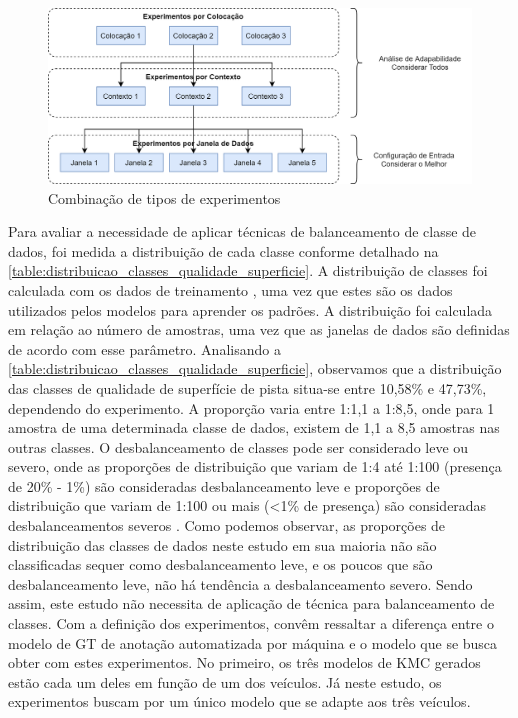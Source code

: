 \begin{figure}[h]
  \centering
  \caption{Combinação de tipos de experimentos}
  \label{fig:combinacao_experimentos_3}
  \includegraphics[width=1\textwidth]{figuras/fig_45_1.png}
\end{figure}

Para avaliar a necessidade de aplicar técnicas de balanceamento de classe de dados, foi medida a distribuição de cada classe conforme detalhado na \autoref{table:distribuicao_classes_qualidade_superficie}. A distribuição de classes foi calculada com os dados de treinamento \cite{He2013,Kuhn2013}, uma vez que estes são os dados utilizados pelos modelos para aprender os padrões. A distribuição foi calculada em relação ao número de amostras, uma vez que as janelas de dados são definidas de acordo com esse parâmetro. Analisando a \autoref{table:distribuicao_classes_qualidade_superficie}, observamos que a distribuição das classes de qualidade de superfície de pista situa-se entre 10,58\% e 47,73\%, dependendo do experimento. A proporção varia entre 1:1,1 a 1:8,5, onde para 1 amostra de uma determinada classe de dados, existem de 1,1 a 8,5 amostras nas outras classes. O desbalanceamento de classes pode ser considerado leve ou severo, onde as proporções de distribuição que variam de 1:4 até 1:100 (presença de 20\% - 1\%) são consideradas desbalanceamento leve e proporções de distribuição que variam de 1:100 ou mais (<1\% de presença) são consideradas desbalanceamentos severos \cite{Krawczyk2016,Brownlee2020}. Como podemos observar, as proporções de distribuição das classes de dados neste estudo em sua maioria não são classificadas sequer como desbalanceamento leve, e os poucos que são desbalanceamento leve, não há tendência a desbalanceamento severo. Sendo assim, este estudo não necessita de aplicação de técnica para balanceamento de classes. Com a definição dos experimentos, convêm ressaltar a diferença entre o modelo de GT de anotação automatizada por máquina e o modelo que se busca obter com estes experimentos. No primeiro, os três modelos de KMC gerados estão cada um deles em função de um dos veículos. Já neste estudo, os experimentos buscam por um único modelo que se adapte aos três veículos.

